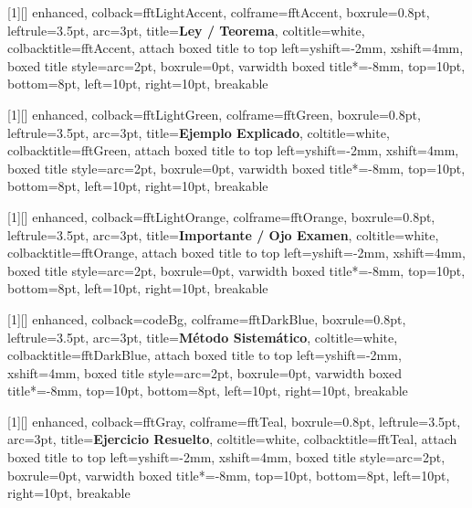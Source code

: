 [1][]{
  enhanced,
  colback=fftLightAccent,
  colframe=fftAccent,
  boxrule=0.8pt,
  leftrule=3.5pt,
  arc=3pt,
  title=\textbf{\textsf{Ley / Teorema}},
  coltitle=white,
  colbacktitle=fftAccent,
  attach boxed title to top left={yshift=-2mm, xshift=4mm},
  boxed title style={arc=2pt, boxrule=0pt},
  varwidth boxed title*=-8mm,
  top=10pt,
  bottom=8pt,
  left=10pt,
  right=10pt,
  breakable
}

[1][]{
  enhanced,
  colback=fftLightGreen,
  colframe=fftGreen,
  boxrule=0.8pt,
  leftrule=3.5pt,
  arc=3pt,
  title=\textbf{\textsf{Ejemplo Explicado}},
  coltitle=white,
  colbacktitle=fftGreen,
  attach boxed title to top left={yshift=-2mm, xshift=4mm},
  boxed title style={arc=2pt, boxrule=0pt},
  varwidth boxed title*=-8mm,
  top=10pt,
  bottom=8pt,
  left=10pt,
  right=10pt,
  breakable
}

[1][]{
  enhanced,
  colback=fftLightOrange,
  colframe=fftOrange,
  boxrule=0.8pt,
  leftrule=3.5pt,
  arc=3pt,
  title=\textbf{\textsf{Importante / Ojo Examen}},
  coltitle=white,
  colbacktitle=fftOrange,
  attach boxed title to top left={yshift=-2mm, xshift=4mm},
  boxed title style={arc=2pt, boxrule=0pt},
  varwidth boxed title*=-8mm,
  top=10pt,
  bottom=8pt,
  left=10pt,
  right=10pt,
  breakable
}

[1][]{
  enhanced,
  colback=codeBg,
  colframe=fftDarkBlue,
  boxrule=0.8pt,
  leftrule=3.5pt,
  arc=3pt,
  title=\textbf{\textsf{Método Sistemático}},
  coltitle=white,
  colbacktitle=fftDarkBlue,
  attach boxed title to top left={yshift=-2mm, xshift=4mm},
  boxed title style={arc=2pt, boxrule=0pt},
  varwidth boxed title*=-8mm,
  top=10pt,
  bottom=8pt,
  left=10pt,
  right=10pt,
  breakable
}

[1][]{
  enhanced,
  colback=fftGray,
  colframe=fftTeal,
  boxrule=0.8pt,
  leftrule=3.5pt,
  arc=3pt,
  title=\textbf{\textsf{Ejercicio Resuelto}},
  coltitle=white,
  colbacktitle=fftTeal,
  attach boxed title to top left={yshift=-2mm, xshift=4mm},
  boxed title style={arc=2pt, boxrule=0pt},
  varwidth boxed title*=-8mm,
  top=10pt,
  bottom=8pt,
  left=10pt,
  right=10pt,
  breakable
}

